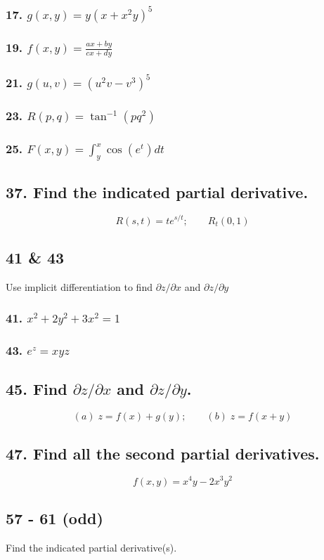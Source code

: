 \documentclass{article}
\begin{document}
\subsubsection*{17. $g(x,y) = y(x + x^2 y)^5$}
\subsubsection*{19. $f(x,y) = \displaystyle\frac{ax + by}{cx + dy}$}
\subsubsection*{21. $g(u, v) = (u^2v-v^3)^5$}
\subsubsection*{23. $R(p, q) = \tan^{-1} (pq^2)$}
\subsubsection*{25. $F(x,y) = \int_y^x \cos (e^t) dt$}
\subsection*{37. Find the indicated partial derivative.}
\[
    R(s,t) = te^{s/t}; \qquad R_t (0,1)
\]
\subsection*{41 \& 43}
Use implicit differentiation to find $\partial z / \partial x$ and $\partial z / \partial y$
\subsubsection*{41. $x^2 + 2y^2 + 3x^2 = 1$}
\subsubsection*{43. $e^z = xyz$}
\subsection*{45. Find $\partial z / \partial x$ and $\partial z / \partial y$.}
\[
    (a)\; z = f(x) + g(y); \qquad (b)\; z = f(x + y) 
\]
\subsection*{47. Find all the second partial derivatives.}
\[
    f(x,y) = x^4y - 2x^3y^2
\]
\subsection*{57 - 61 (odd)}
Find the indicated partial derivative(s).
\end{document}
